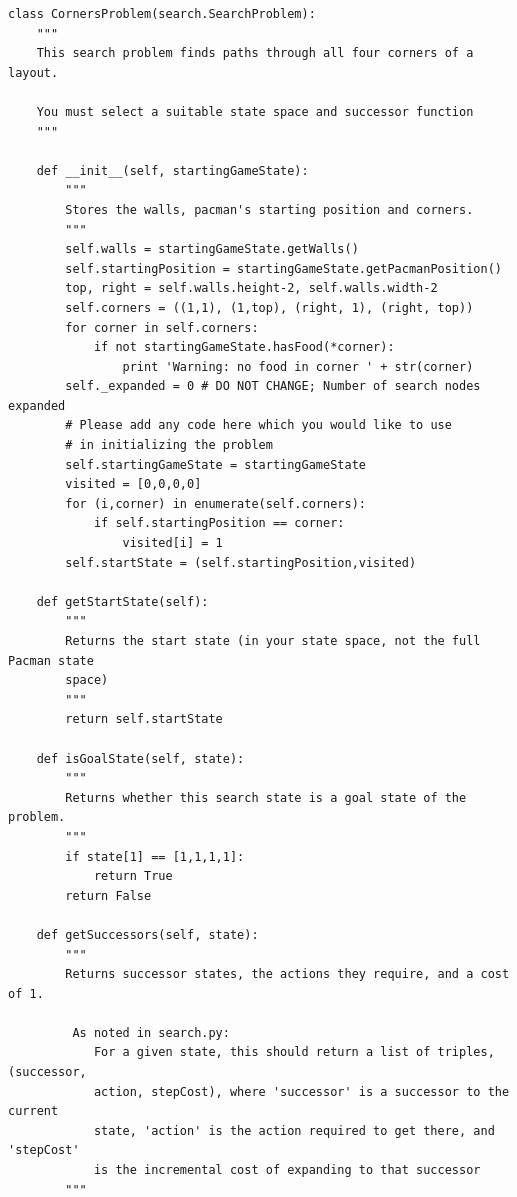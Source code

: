 \documentclass[a4paper, 11pt]{article}
\begin{document}
\begin{lstlisting}
class CornersProblem(search.SearchProblem):
    """
    This search problem finds paths through all four corners of a layout.

    You must select a suitable state space and successor function
    """

    def __init__(self, startingGameState):
        """
        Stores the walls, pacman's starting position and corners.
        """
        self.walls = startingGameState.getWalls()
        self.startingPosition = startingGameState.getPacmanPosition()
        top, right = self.walls.height-2, self.walls.width-2
        self.corners = ((1,1), (1,top), (right, 1), (right, top))
        for corner in self.corners:
            if not startingGameState.hasFood(*corner):
                print 'Warning: no food in corner ' + str(corner)
        self._expanded = 0 # DO NOT CHANGE; Number of search nodes expanded
        # Please add any code here which you would like to use
        # in initializing the problem
        self.startingGameState = startingGameState
        visited = [0,0,0,0]
        for (i,corner) in enumerate(self.corners):
            if self.startingPosition == corner:
                visited[i] = 1
        self.startState = (self.startingPosition,visited)

    def getStartState(self):
        """
        Returns the start state (in your state space, not the full Pacman state
        space)
        """
        return self.startState

    def isGoalState(self, state):
        """
        Returns whether this search state is a goal state of the problem.
        """
        if state[1] == [1,1,1,1]:
            return True
        return False

    def getSuccessors(self, state):
        """
        Returns successor states, the actions they require, and a cost of 1.

         As noted in search.py:
            For a given state, this should return a list of triples, (successor,
            action, stepCost), where 'successor' is a successor to the current
            state, 'action' is the action required to get there, and 'stepCost'
            is the incremental cost of expanding to that successor
        """


\end{lstlisting}
\end{document}
